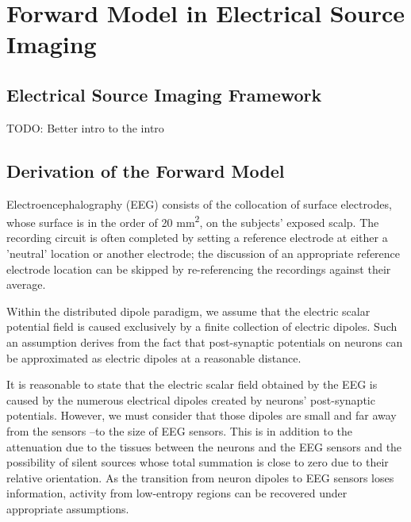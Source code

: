 \chapter{Forward Model in Electrical Source Imaging}
\label{ch:forward}

\section{Electrical Source Imaging Framework}

TODO: Better intro to the intro



\section{Derivation of the Forward Model}

Electroencephalography (EEG) consists of the collocation of surface electrodes, whose surface is in the order of 20 \si{mm^2}, on the subjects' exposed scalp.
%
The recording circuit is often completed by setting a reference electrode at either a 'neutral' location or another electrode; the discussion of an appropriate reference electrode location can be skipped by re-referencing the recordings against their average.

Within the distributed dipole paradigm, we assume that the electric scalar potential field is caused exclusively by a finite collection of electric dipoles. 
%
Such an assumption derives from the fact that post-synaptic potentials on neurons can be approximated as electric dipoles at a reasonable distance.

It is reasonable to state that the electric scalar field obtained by the EEG is caused by the numerous electrical dipoles created by neurons' post-synaptic potentials.
%
However, we must consider that those dipoles are small and far away from the sensors --to the size of EEG sensors.
%
This is in addition to the attenuation due to the tissues between the neurons and the EEG sensors and the possibility of silent sources whose total summation is close to zero due to their relative orientation.
%
As the transition from neuron dipoles to EEG sensors loses information, activity from low-entropy regions can be recovered under appropriate assumptions.

